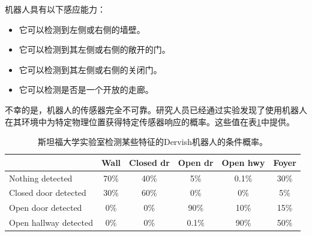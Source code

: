 
机器人具有以下感应能力：

\begin{itemize}

\item 它可以检测到左侧或右侧的墙壁。
\item 它可以检测到其左侧或右侧的敞开的门。
\item 它可以检测到其左侧或右侧的关闭门。
\item 它可以检测是否是一个开放的走廊。
\end{itemize}


不幸的是，机器人的传感器完全不可靠。研究人员已经通过实验发现了使用机器人在其环境中为特定物理位置获得特定传感器响应的概率。这些值在表\ref{tab:dervish_example}中提供。

\begin{table}
\footnotesize
\begin{tabular}{lccccc}
 	& Wall	& Closed dr & Open dr	& Open hwy & Foyer\\
\hline
Nothing detected	& 70\%	& 40\%&	5\%	& 0.1\% & 30\%\\
Closed door detected & 30\% &	60\%& 0\% &0\%	& 5\%\\
Open door detected & 0\%	& 0\%&	90\% & 10\% & 15\%\\
Open hallway detected & 0\% &	 0\%&	0.1\% & 90\% &50\%\\
\hline
\end{tabular}
\normalsize
\caption{斯坦福大学实验室检测某些特征的Dervish机器人的条件概率。\label{tab:dervish_example}}
\end{table}


